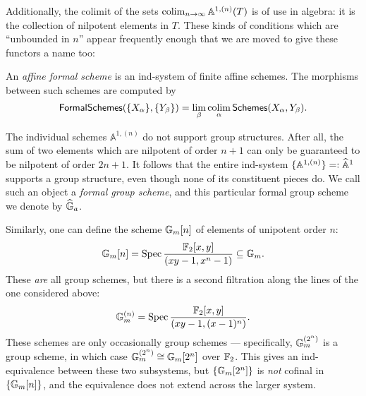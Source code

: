 Additionally, the colimit of the sets $\operatorname*{colim}_{n \to \infty} \mathbb A^{1,(n)}(T)$ is of use in algebra: it is the collection of nilpotent elements in $T$.  These kinds of conditions which are ``unbounded in $n$'' appear frequently enough that we are moved to give these functors a name too:
\begin{definition}
An \textit{affine formal scheme} is an ind-system of finite affine schemes.    The morphisms between such schemes are computed by \[\mathsf{FormalSchemes}(\{X_\alpha\}, \{Y_\beta\}) = \lim_\beta \operatorname*{colim}_\alpha \mathsf{Schemes}(X_\alpha, Y_\beta).\]
\end{definition}


\begin{example}\label{FormalGaExample}
The individual schemes $\mathbb A^{1, (n)}$ do not support group structures.  After all, the sum of two elements which are nilpotent of order $n+1$ can only be guaranteed to be nilpotent of order $2n+1$.  It follows that the entire ind-system $\{\mathbb A^{1, (n)}\} =: \widehat{\mathbb{A}}^1$ supports a group structure, even though none of its constituent pieces do.  We call such an object a \textit{formal group scheme}, and this particular formal group scheme we denote by $\widehat{\mathbb G}_a$.
\end{example}

\begin{example}
Similarly, one can define the scheme $\mathbb G_m[n]$ of elements of unipotent order $n$: \[\mathbb G_m[n] = \operatorname{Spec} \frac{\mathbb F_2[x,y]}{(xy - 1, x^n - 1)} \subseteq \mathbb G_m.\]  These \emph{are} all group schemes, but there is a second filtration along the lines of the one considered above: \[\mathbb G_m^{(n)} = \operatorname{Spec} \frac{\mathbb F_2[x,y]}{(xy - 1, (x - 1)^n)}.\]  These schemes are only occasionally group schemes --- specifically, $\mathbb G_m^{(2^n)}$ is a group scheme, in which case $\mathbb G_m^{(2^n)} \cong \mathbb G_m[2^n]$ over $\mathbb F_2$.  This gives an ind-equivalence between these two subsystems, but $\{\mathbb G_m[2^n]\}$ is \emph{not} cofinal in $\{\mathbb G_m[n]\}$, and the equivalence does not extend across the larger system.
\end{example}

